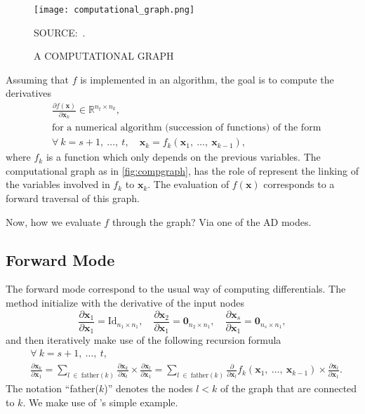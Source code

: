 \begin{figure}[H]
 \setlength{\abovecaptionskip}{.0001pt}
 \caption{A COMPUTATIONAL GRAPH}
 \vspace{0.3cm}\centering
 \texttt{[image: computational\_graph.png]}\\
 \vspace{0.3cm}
 \begin{footnotesize}
  SOURCE:~.
 \end{footnotesize}
 \label{fig:compgraph}
\end{figure}

Assuming that \(f\) is implemented in an algorithm, the goal is to
compute the derivatives
\begin{align*}
 &\frac{\partial f(\bm{x})}{\partial\bm{x}_{k}}\in
  \mathbb{R}^{n_{t} \times n_{k}},\\
 &\text{for a numerical algorithm (succession of functions)
        of the form}\\
 &\forall~k = s + 1,~\dots,~t,\quad
  \bm{x}_{k} = f_{k}(\bm{x}_{1},~\dots,~\bm{x}_{k-1}),
\end{align*}
where \(f_{k}\) is a function which only depends on the previous
variables. The computational graph as in \autoref{fig:compgraph}, has
the role of represent the linking of the variables involved in \(f_{k}\)
to \(\bm{x}_{k}\). The evaluation of \(f(\bm{x})\) corresponds to a
forward traversal of this graph.

Now, how we evaluate \(f\) through the graph? Via one of the AD modes.

\subsection{Forward Mode}

The forward mode correspond to the usual way of computing differentials.
The method initialize with the derivative of the input nodes
\[
 \frac{\partial\bm{x}_{1}}{\partial\bm{x}_{1}} =
 \text{Id}_{n_{1} \times n_{1}},\quad
 \frac{\partial\bm{x}_{2}}{\partial\bm{x}_{1}} =
 \bm{0}_{n_{2} \times n_{1}},\quad
 \frac{\partial\bm{x}_{s}}{\partial\bm{x}_{1}} =
 \bm{0}_{n_{s} \times n_{1}},
\]
and then iteratively make use of the following recursion formula
\begin{align*}
 &\forall~k = s + 1,~\dots,~t,\\
 &\frac{\partial\bm{x}_{k}}{\partial\bm{x}_{1}} =
  \sum_{l~\in~\text{father}(k)}
  \frac{\partial\bm{x}_{k}}{\partial\bm{x}_{l}}\times
  \frac{\partial\bm{x}_{l}}{\partial\bm{x}_{1}} =
  \sum_{l~\in~\text{father}(k)}
  \frac{\partial}{\partial\bm{x}_{l}}
  f_{k}(\bm{x}_{1},~\dots,~\bm{x}_{k-1})\times
  \frac{\partial\bm{x}_{l}}{\partial\bm{x}_{1}}.
\end{align*}
The notation ``father(\(k\))'' denotes the nodes \(l < k\) of the graph
that are connected to \(k\). We make use of 's
simple example.

